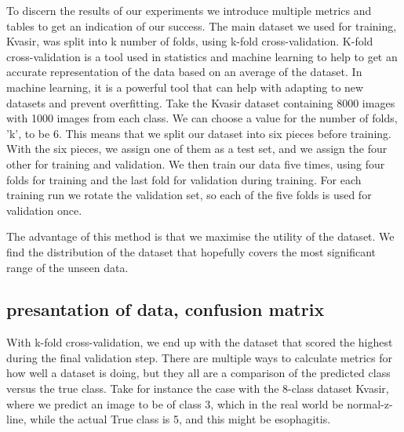 To discern the results of our experiments we introduce multiple metrics and tables to get an indication of our success. 
The main dataset we used for training, Kvasir, was split into k number of folds, using k-fold cross-validation. 
K-fold cross-validation is a tool used in statistics and machine learning to help to get an accurate representation of the data based on an average of the dataset.  In machine learning, it is a powerful tool that can help with adapting to new datasets and prevent overfitting. 
Take the Kvasir dataset containing 8000 images with 1000 images from each class. We can choose a value for the number of folds, 'k', to be 6. This means that we split our dataset into six pieces before training.  With the six pieces, we assign one of them as a test set, and we assign the four other for training and validation. We then train our data five times, using four folds for training and the last fold for validation during training. For each training run we rotate the validation set, so each of the five folds is used for validation once. 

The advantage of this method is that we maximise the utility of the dataset. We find the distribution of the dataset that hopefully covers the most significant range of the unseen data. 

\subsection{presantation of data, confusion matrix}
With k-fold cross-validation, we end up with the dataset that scored the highest during the final validation step.  There are multiple ways to calculate metrics for how well a dataset is doing,  but they all are a comparison of the predicted class versus the true class.  
Take for instance the case with the 8-class dataset Kvasir, where we predict an image to be of class 3, which in the real world be normal-z-line, while the actual True class is 5, and this might be esophagitis.

